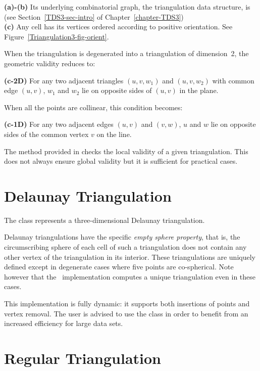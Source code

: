 {\bf (a)-(b)} Its underlying combinatorial graph, the triangulation
data structure, is  
(see Section~\ref{TDS3-sec-intro} of Chapter~\ref{chapter-TDS3})\\
{\bf (c)} Any cell has its vertices ordered according to positive
orientation. See Figure~\ref{Triangulation3-fig-orient}.

When the triangulation is degenerated into a triangulation of
dimension~2, the  geometric validity reduces to:

{\bf (c-2D)} For any two adjacent triangles $(u,v,w_1)$ and $(u,v,w_2)$ with
common edge $(u,v)$, $w_1$ and $w_2$ lie on opposite sides of $(u,v)$
in the plane.

When all the points are collinear, this condition becomes:

{\bf (c-1D)} For any two adjacent edges $(u,v)$ and $(v,w)$, $u$ and
$w$ lie on opposite sides of the common vertex $v$ on the line.

The  method provided in  checks
the local validity of a given triangulation. This does not always
ensure global validity \cite{mnssssu-cgpvg-96,dlpt-ccpps-98} but it is 
sufficient for practical cases.


\section{Delaunay Triangulation} 

The class  represents a three-dimensional
Delaunay triangulation.

Delaunay triangulations have the specific \textit{empty sphere property},
that is, the circumscribing sphere of each cell of such a triangulation
does not contain any other vertex of the triangulation in its interior.
These triangulations are uniquely defined except in degenerate cases
where five points are co-spherical.  Note however that the \cgal\ implementation
computes a unique triangulation even in these cases.

This implementation is fully dynamic: it supports both insertions of points
and vertex removal.
The user is advised to use the class  in
order to benefit from an increased efficiency for large data sets. 

\section{Regular Triangulation\label{Triangulation3-sec-class-Regulartriangulation}}

